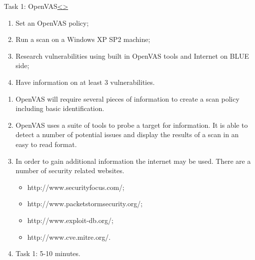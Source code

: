\documentclass[12pt]{extarticle}
\newenvironment{instructionblock}{\Large\bgroup}{\egroup}
\begin{document}
\begin{slide}{Task 1: OpenVAS\cite{b1}}{\hyperref[slide 4]{\textless}\hyperref[slide 6]{\textgreater}}
	\begin{instructionblock}
		\begin{enumerate}
			\item Set an OpenVAS policy;
			\item Run a scan on a Windows XP SP2 machine;
			\item Research vulnerabilities using built in OpenVAS tools and Internet on BLUE side;
			\item Have information on at least 3 vulnerabilities.
		\end{enumerate}
	\end{instructionblock}
\end{slide}

\begin{enumerate}
	\item OpenVAS will require several pieces of information to create a scan policy including basic identification.
	\item OpenVAS uses a suite of tools to probe a target for information. It is able to detect a number of potential issues and display the results of a scan in an easy to read format.
	\item In order to gain additional information the internet may be used. There are a number of security related websites\cite{b1}.
	\begin{itemize}
		\item http://www.securityfocus.com/;
		\item http://www.packetstormsecurity.org/;
		\item http://www.exploit-db.org/;
		\item http://www.cve.mitre.org/.
	\end{itemize}
	\item Task 1: 5-10 minutes.
\end{enumerate}


\pagebreak
\end{document}
